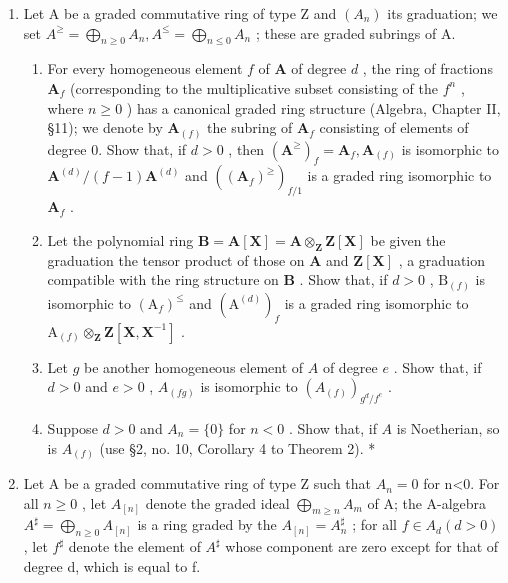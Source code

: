 
\begin{enumerate}
\def\labelenumi{\arabic{enumi}.}
\tightlist
\item
  Let A be a graded commutative ring of type Z and \((A_{n})\) its graduation; we set \(A^{\geq} = \bigoplus_{n \geq 0} A_{n}, A^{\leq} = \bigoplus_{n \leqslant 0} A_{n}\) ; these are graded subrings of A.

\begin{enumerate}
\def\labelenumii{(\alph{enumii})}
\item
  For every homogeneous element \(f\) of \(\mathbf{A}\) of degree \(d\) , the ring of fractions \(\mathbf{A}_f\) (corresponding to the multiplicative subset consisting of the \(f^n\) , where \(n \geqslant 0\) ) has a canonical graded ring structure (Algebra, Chapter II, §11); we denote by \(\mathbf{A}_{(f)}\) the subring of \(\mathbf{A}_f\) consisting of elements of degree 0. Show that, if \(d > 0\) , then \((\mathbf{A}^{\geq})_f = \mathbf{A}_f, \mathbf{A}_{(f)}\) is isomorphic to \(\mathbf{A}^{(d)} / (f - 1)\mathbf{A}^{(d)}\) and \(((\mathbf{A}_f)^{\geq})_{f/1}\) is a graded ring isomorphic to \(\mathbf{A}_f\) .
\item
  Let the polynomial ring \(\mathbf{B} = \mathbf{A}[\mathbf{X}] = \mathbf{A} \otimes_{\mathbf{Z}} \mathbf{Z}[\mathbf{X}]\) be given the graduation the tensor product of those on \(\mathbf{A}\) and \(\mathbf{Z}[\mathbf{X}]\) , a graduation compatible with the ring structure on \(\mathbf{B}\) . Show that, if \(d > 0\) , \(\mathrm{B}_{(f)}\) is isomorphic to \((\mathrm{A}_f)^{\leqslant}\) and \((\mathrm{A}^{(d)})_f\) is a graded ring isomorphic to \(\mathrm{A}_{(f)} \otimes_{\mathbf{Z}} \mathbf{Z}[\mathbf{X}, \mathbf{X}^{-1}]\) .
\item
  Let \(g\) be another homogeneous element of \(A\) of degree \(e\) . Show that, if \(d > 0\) and \(e > 0\) , \(A_{(fg)}\) is isomorphic to \((A_{(f)})_{g^d / f^e}\) .\\
\item[* (d)] Suppose \(d > 0\) and \(A_n = \{0\}\) for \(n < 0\) . Show that, if \(A\) is Noetherian, so is \(A_{(f)}\) (use §2, no. 10, Corollary 4 to Theorem 2). *
\end{enumerate}

\item
  Let A be a graded commutative ring of type Z such that \(A_{n}=0\) for n\textless0. For all \(n\geqslant0\) , let \(A_{[n]}\) denote the graded ideal \(\bigoplus_{m\geqslant n}A_{m}\) of A; the A-algebra \(A^{\sharp}=\bigoplus_{n\geqslant0}A_{[n]}\) is a ring graded by the \(A_{[n]}=A_{n}^{\sharp}\) ; for all \(f\in A_{d}(d>0)\) , let \(f^{\sharp}\) denote the element of \(A^{\sharp}\) whose component are zero except for that of degree d, which is equal to f.


\end{enumerate}
